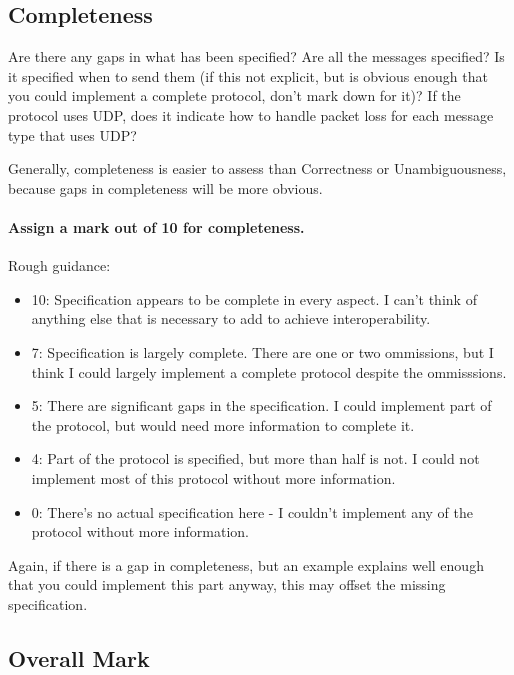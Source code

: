 \documentclass{article}
\begin{document}
\subsection*{Completeness}

Are there any gaps in what has been specified?  Are all the messages
specified?  Is it specified when to send them (if this not explicit,
but is obvious enough that you could implement a complete protocol, don't
mark down for it)?  If the protocol uses UDP, does it indicate how to
handle packet loss for each message type that uses UDP?

Generally, completeness is easier to assess than Correctness or
Unambiguousness, because gaps in completeness will be more obvious.

\paragraph{Assign a mark out of 10 for completeness.}

Rough guidance:

\begin{itemize}
\item 10:  Specification appears to be complete in every aspect.  I can't think of anything else that is necessary to add to achieve interoperability.

\item 7:  Specification is largely complete.  There are one or two ommissions, but I think I could largely implement a complete protocol despite the ommisssions.

\item 5:  There are significant gaps in the specification.  I could implement part of the protocol, but would need more information to complete it.

\item 4:  Part of the protocol is specified, but more than half is not.  I could not implement most of this protocol without more information.

\item 0:  There's no actual specification here - I couldn't implement any of the protocol without more information.
\end{itemize}

Again, if there is a gap in completeness, but an example explains well
enough that you could implement this part anyway, this may offset the
missing specification.

\subsection*{Overall Mark}
\end{document}
